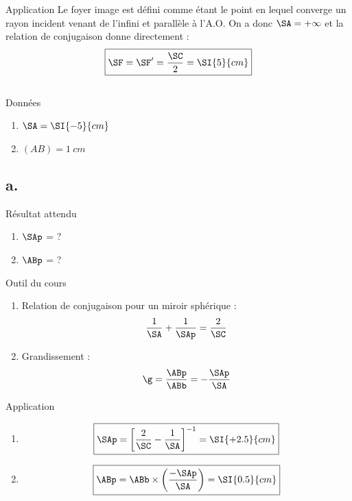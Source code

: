 \documentclass[10pt,a5paper,notitlepage]{book}
\begin{document}
\begin{NCexem}{Application}
    Le foyer image est défini comme étant le point en lequel converge un rayon
    incident venant de l'infini et parallèle à l'A.O. On a donc $\SA = +\infty$
    et la relation de conjugaison donne directement :
    \[ \boxed{\SF = \SF' = \frac{\SC}{2} = \SI{5}{cm}} \]
\end{NCexem}

\subsection{}
\begin{NCdefi}{Données}
    \begin{enumerate}
        \item $\SA = \SI{-5}{cm}$
        \item $(AB) = \SI{1}{cm}$
    \end{enumerate}
\end{NCdefi}

\setcounter{subsection}{1}
\subsection{a.}
\begin{NCprop}{Résultat attendu}
    \begin{enumerate}
        \item $\SAp$ = ?
        \item $\ABp$ = ?
    \end{enumerate}
\end{NCprop}

\begin{NCdemo}{Outil du cours}
    \begin{enumerate}
        \item Relation de conjugaison pour un miroir sphérique :
            \[ \frac{1}{\SA} + \frac{1}{\SAp} = \frac{2}{\SC} \]
        \item Grandissement :
            \[ \g = \frac{\ABp}{\ABb} = - \frac{\SAp}{\SA} \]
    \end{enumerate}
    
\end{NCdemo}

\begin{NCexem}{Application}
    \begin{enumerate}
        \item \[ \boxed{\SAp = \left[ \frac{2}{\SC}- \frac{1}{\SA}\right]^{-1} =
            \SI{+2.5}{cm}}\]
        \item \[ \boxed{\ABp = \ABb\times \left( \frac{-\SAp}{\SA} \right)
                             = \SI{0.5}{cm}} \]
    \end{enumerate}
\end{NCexem}
\end{document}
